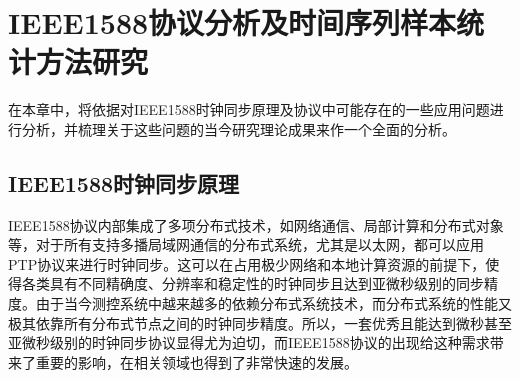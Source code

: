 
\chapter{IEEE1588协议分析及时间序列样本统计方法研究}
\label{chap:1588_theory}
在本章中，将依据对IEEE1588时钟同步原理及协议中可能存在的一些应用问题进行分析，并梳理关于这些问题的当今研究理论成果来作一个全面的分析。

\section{IEEE1588时钟同步原理}
IEEE1588协议内部集成了多项分布式技术，如网络通信、局部计算和分布式对象等，对于所有支持多播局域网通信的分布式系统，尤其是以太网，都可以应用PTP协议来进行时钟同步。这可以在占用极少网络和本地计算资源的前提下，使得各类具有不同精确度、分辨率和稳定性的时钟同步且达到亚微秒级别的同步精度。由于当今测控系统中越来越多的依赖分布式系统技术，而分布式系统的性能又极其依靠所有分布式节点之间的时钟同步精度。所以，一套优秀且能达到微秒甚至亚微秒级别的时钟同步协议显得尤为迫切，而IEEE1588协议的出现给这种需求带来了重要的影响，在相关领域也得到了非常快速的发展。






